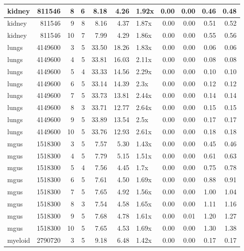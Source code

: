 \begin{table}[ht]
\begin{tabular}{lrrrrrlrrrr}
   \hline
kidney & 811546 &   8 &   6 & 8.18 & 4.26 & 1.92x & 0.00 & 0.00 & 0.46 & 0.48 \\ 
   \hline
kidney & 811546 &   9 &   8 & 8.16 & 4.37 & 1.87x & 0.00 & 0.00 & 0.51 & 0.52 \\ 
   \hline
kidney & 811546 &  10 &   7 & 7.99 & 4.29 & 1.86x & 0.00 & 0.00 & 0.55 & 0.56 \\ 
   \hline
lungs & 4149600 &   3 &   5 & 33.50 & 18.26 & 1.83x & 0.00 & 0.00 & 0.06 & 0.06 \\ 
   \hline
lungs & 4149600 &   4 &   5 & 33.81 & 16.03 & 2.11x & 0.00 & 0.00 & 0.08 & 0.08 \\ 
   \hline
lungs & 4149600 &   5 &   4 & 33.33 & 14.56 & 2.29x & 0.00 & 0.00 & 0.10 & 0.10 \\ 
   \hline
lungs & 4149600 &   6 &   5 & 33.14 & 14.39 & 2.3x & 0.00 & 0.00 & 0.12 & 0.12 \\ 
   \hline
lungs & 4149600 &   7 &   5 & 33.73 & 13.81 & 2.44x & 0.00 & 0.00 & 0.14 & 0.14 \\ 
   \hline
lungs & 4149600 &   8 &   3 & 33.71 & 12.77 & 2.64x & 0.00 & 0.00 & 0.15 & 0.15 \\ 
   \hline
lungs & 4149600 &   9 &   5 & 33.89 & 13.54 & 2.5x & 0.00 & 0.00 & 0.17 & 0.17 \\ 
   \hline
lungs & 4149600 &  10 &   5 & 33.76 & 12.93 & 2.61x & 0.00 & 0.00 & 0.18 & 0.18 \\ 
   \hline
mgus & 1518300 &   3 &   5 & 7.57 & 5.30 & 1.43x & 0.00 & 0.00 & 0.45 & 0.46 \\ 
   \hline
mgus & 1518300 &   4 &   5 & 7.79 & 5.15 & 1.51x & 0.00 & 0.00 & 0.61 & 0.63 \\ 
   \hline
mgus & 1518300 &   5 &   4 & 7.56 & 4.45 & 1.7x & 0.00 & 0.00 & 0.75 & 0.78 \\ 
   \hline
mgus & 1518300 &   6 &   5 & 7.61 & 4.50 & 1.69x & 0.00 & 0.00 & 0.88 & 0.91 \\ 
   \hline
mgus & 1518300 &   7 &   5 & 7.65 & 4.92 & 1.56x & 0.00 & 0.00 & 1.00 & 1.04 \\ 
   \hline
mgus & 1518300 &   8 &   3 & 7.54 & 4.58 & 1.65x & 0.00 & 0.00 & 1.11 & 1.16 \\ 
   \hline
mgus & 1518300 &   9 &   5 & 7.68 & 4.78 & 1.61x & 0.00 & 0.01 & 1.20 & 1.27 \\ 
   \hline
mgus & 1518300 &  10 &   5 & 7.65 & 4.53 & 1.69x & 0.00 & 0.00 & 1.30 & 1.38 \\ 
   \hline
myeloid & 2790720 &   3 &   5 & 9.18 & 6.48 & 1.42x & 0.00 & 0.00 & 0.17 & 0.17 \\ 

\end{tabular}
\end{table}
